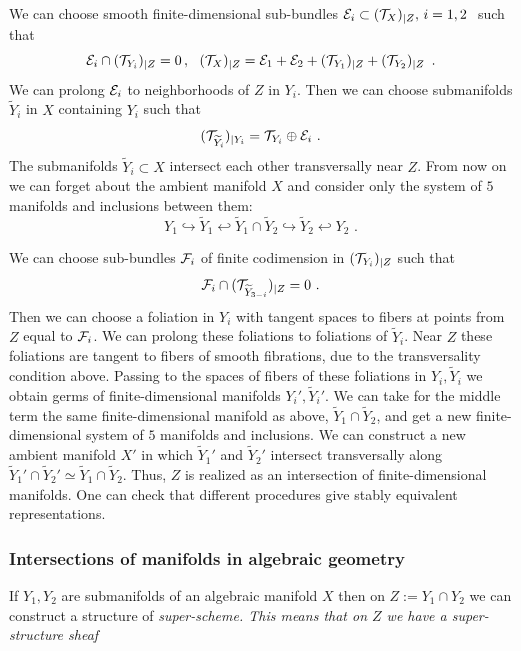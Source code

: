 \documentclass{amsart}
\begin{document}
We can choose smooth finite-dimensional sub-bundles $\mathcal E_i\subset (\mathcal
T_X)_{|Z},\,i=1,2\,\,$ such that
 $$\mathcal E_i\cap (\mathcal T_{Y_i})_{|Z}=0\,,\,\,\,\,
 (\mathcal T_X)_{|Z}=\mathcal E_1+\mathcal E_2+(\mathcal T_{Y_1})_{|Z}+(\mathcal
T_{Y_2})_{|Z}\,\,\,.$$
We can prolong $\mathcal E_i$ to  neighborhoods of $Z$ in $Y_i$.
Then we can choose  submanifolds $\widetilde Y_i$ in $X$ containing $Y_i$ such
that
$$(\mathcal T_{\widetilde Y_i})_{|Y_i}=\mathcal T_{Y_i}\oplus \mathcal E_i\,\,.$$
The submanifolds $\widetilde Y_i\subset X$ intersect each other transversally
near $Z$. From now on we can forget about the ambient manifold $X$ and consider
only the system of $5$ manifolds and inclusions between them:
$$Y_1\hookrightarrow \widetilde Y_1\hookleftarrow\widetilde Y_1\cap\widetilde
Y_2\hookrightarrow \widetilde Y_2\hookleftarrow Y_2\,\,.$$

We can choose  sub-bundles $\mathcal F_i$ of finite codimension in $(\mathcal
T_{Y_i})_{|Z}$ such that
  $$\mathcal F_i\cap(\mathcal T_{\widetilde Y_{3-i}})_{|Z}=0\,\,.$$
Then we can choose a foliation in $Y_i$ with tangent spaces to fibers at points
from $Z$ equal to $\mathcal F_i$. We can prolong these
 foliations to foliations of $\widetilde Y_i$. Near $Z$ these foliations are
tangent to fibers of smooth fibrations, due to the transversality
 condition above.  Passing to the spaces of fibers of these foliations in
$Y_i,\widetilde Y_i$ we obtain germs of finite-dimensional manifolds
$Y_i',\widetilde Y_i'$.
  We can take for  the middle term the same finite-dimensional manifold as
above, $\widetilde Y_1\cap\widetilde Y_2$, and get a new finite-dimensional
system of $5$ manifolds and inclusions. We can construct a new  ambient
manifold $X'$ in which $\widetilde Y_1'$  and $\widetilde Y_2'$ intersect
transversally  along
 $\widetilde Y_1'\cap\widetilde Y_2' \simeq\widetilde Y_1\cap\widetilde Y_2$.
 Thus,  $Z$ is realized as an intersection of finite-dimensional manifolds. One
can check that
 different procedures give  stably equivalent representations.




\subsubsection{Intersections of manifolds in algebraic geometry}


 If $Y_1,Y_2$ are submanifolds of an algebraic manifold $X$ then on $Z:=Y_1\cap
Y_2$ we can construct a structure of \it super-scheme\rm. This means that on
$Z$ we have a super-structure sheaf
\end{document}
